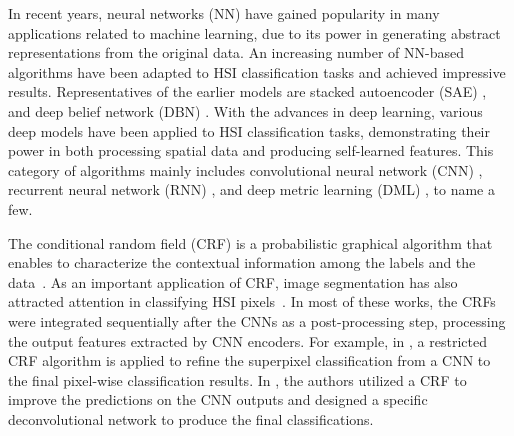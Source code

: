 \documentclass[]{article}
\newcommand{\red}{\color{black}}
\newcommand{\magentaso}{\color{black}}
\begin{document}
In recent years, neural networks (NN) have gained popularity in many applications related to machine learning, 
due to its power in {\magentaso generating} abstract representations from the original data. 
An increasing number of NN-based algorithms
have been adapted to HSI classification {\magentaso tasks} and achieved {\red impressive} results.
Representatives of the earlier models are stacked autoencoder (SAE)
\cite{chen2014deep}, and deep belief network (DBN) \cite{chen2015spectral}.
With the advances in deep learning, various deep models have been applied to HSI classification tasks, 
{\magentaso demonstrating their power in both processing spatial data and producing self-learned features.}
This category of algorithms mainly {\magentaso includes} convolutional neural network (CNN)
\cite{slavkovikj2015hyperspectral,chen2016deep, Jiao2017Deep},
recurrent neural network (RNN)
\cite{Mou2017Deep, liu2017bidirectional, zhang2018spatial}, and
deep metric learning (DML) \cite{guo2017spectral, guo2018cnn, cheng2018when}, to name a few.


The conditional random field (CRF) is a probabilistic graphical algorithm 
that enables to characterize the contextual information among the labels and the 
data~\cite{lafferty2001conditional}. As an important application of CRF, 
image segmentation has also attracted attention in
classifying HSI pixels~\cite{alam2016crf, pan2018high, niu2019deeplab, alam2018conditional}. 
In most of these works, {\magentaso the CRFs were integrated sequentially after the} CNNs as a post-processing step, processing the output features extracted by CNN encoders.
{\red
For example, in \cite{pan2018high}, a restricted CRF algorithm is applied to refine the 
superpixel classification {\magentaso from} a CNN to the final pixel-wise classification results.
In \cite{alam2018conditional}, the authors utilized {\magentaso a }CRF to improve the predictions on the CNN outputs and designed
a specific deconvolutional network to produce the final classifications.}
\end{document}
